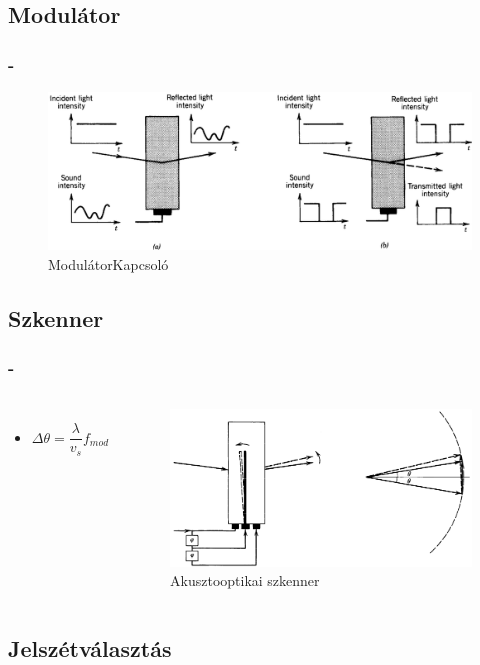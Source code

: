 \documentclass[aspectratio=169]{beamer}
\newcommand{\framet}{\frametitle{\secname{} - \subsecname}}
\begin{document}
\subsection{Modulátor}
\begin{frame}
\framet
\begin{figure}
\includegraphics[width=\textwidth]{mod.png}
\caption{\hspace*{20pt}Modulátor\hspace*{180pt}Kapcsoló}
\end{figure}
\end{frame}
\subsection{Szkenner}
\begin{frame}
\framet
\begin{columns}
\begin{itemize}
\item $\Delta\theta=\dfrac{\lambda}{v_s}f_{mod}$
\end{itemize}
\begin{figure}
\includegraphics[width=.9\textwidth]{scanner.png}
\caption{Akusztooptikai szkenner}
\end{figure}
\end{columns}
\end{frame}

\subsection{Jelszétválasztás}
\end{document}
